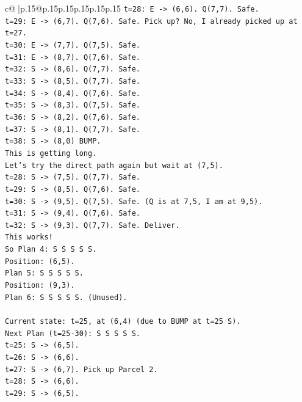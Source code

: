 \documentclass{article}
\begin{document}
{\begin{supertabular}{c@{$\;$}|p{.15\linewidth}@{}p{.15\linewidth}p{.15\linewidth}p{.15\linewidth}p{.15\linewidth}p{.15\linewidth}}
{{{\texttt{t=28: E {-}> (6,6). Q(7,7). Safe.} \\
\texttt{t=29: E {-}> (6,7). Q(7,6). Safe. Pick up? No, I already picked up at t=27.} \\
\texttt{t=30: E {-}> (7,7). Q(7,5). Safe.} \\
\texttt{t=31: E {-}> (8,7). Q(7,6). Safe.} \\
\texttt{t=32: S {-}> (8,6). Q(7,7). Safe.} \\
\texttt{t=33: S {-}> (8,5). Q(7,7). Safe.} \\
\texttt{t=34: S {-}> (8,4). Q(7,6). Safe.} \\
\texttt{t=35: S {-}> (8,3). Q(7,5). Safe.} \\
\texttt{t=36: S {-}> (8,2). Q(7,6). Safe.} \\
\texttt{t=37: S {-}> (8,1). Q(7,7). Safe.} \\
\texttt{t=38: S {-}> (8,0) BUMP.} \\
\texttt{This is getting long.} \\
\texttt{Let's try the direct path again but wait at (7,5).} \\
\texttt{t=28: S {-}> (7,5). Q(7,7). Safe.} \\
\texttt{t=29: S {-}> (8,5). Q(7,6). Safe.} \\
\texttt{t=30: S {-}> (9,5). Q(7,5). Safe. (Q is at 7,5, I am at 9,5).} \\
\texttt{t=31: S {-}> (9,4). Q(7,6). Safe.} \\
\texttt{t=32: S {-}> (9,3). Q(7,7). Safe. Deliver.} \\
\texttt{This works!} \\
\texttt{So Plan 4: S S S S S.} \\
\texttt{Position: (6,5).} \\
\texttt{Plan 5: S S S S S.} \\
\texttt{Position: (9,3).} \\
\texttt{Plan 6: S S S S S. (Unused).} \\
\\ 
\texttt{Current state: t=25, at (6,4) (due to BUMP at t=25 S).} \\
\texttt{Next Plan (t=25{-}30): S S S S S.} \\
\texttt{t=25: S {-}> (6,5).} \\
\texttt{t=26: S {-}> (6,6).} \\
\texttt{t=27: S {-}> (6,7). Pick up Parcel 2.} \\
\texttt{t=28: S {-}> (6,6).} \\
\texttt{t=29: S {-}> (6,5).} \\
}}}
\end{supertabular}}
\end{document}
